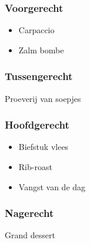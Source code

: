 \subsubsection*{Voorgerecht}
\begin{itemize}
	\item Carpaccio
	\item Zalm bombe
\end{itemize}

\subsubsection*{Tussengerecht}
Proeverij van soepjes

\subsubsection*{Hoofdgerecht}
\begin{itemize}
	\item Biefstuk vlees
	\item Rib-roast
	\item Vangst van de dag
\end{itemize}

\subsubsection*{Nagerecht}
Grand dessert
